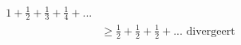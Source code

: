 \documentclass[preview]{standalone}
\begin{document}
\begin{align*}
1+\frac{1}{2}+\frac{1}{3}+\frac{1}{4}+...\\&\geq\frac{1}{2}+\frac{1}{2}+\frac{1}{2}+...\text{ divergeert}
\end{align*}
\end{document}
